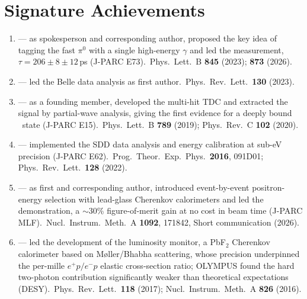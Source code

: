 \documentclass[a4paper,11pt,fontset=none]{ctexart}
\begin{document}
\section{Signature Achievements}
\begin{enumerate}
  \item {} --- as spokesperson and corresponding author, proposed the key idea of tagging the fast $\pi^0$ with a single high-energy $\gamma$ and led the measurement, $\tau=206\pm8\pm12$\,ps (J-PARC E73). \,{\small Phys.\ Lett.\ B \textbf{845} (2023); \textbf{873} (2026).}
  \item {} --- led the Belle data analysis as first author. \,{\small Phys.\ Rev.\ Lett.\ \textbf{130} (2023).}
  \item {} --- as a founding member, developed the multi-hit TDC and extracted the signal by partial-wave analysis, giving the first evidence for a deeply bound \Kmpp\ state (J-PARC E15). \,{\small Phys.\ Lett.\ B \textbf{789} (2019); Phys.\ Rev.\ C \textbf{102} (2020).}
  \item {} --- implemented the SDD data analysis and energy calibration at sub-eV precision (J-PARC E62). \,{\small Prog.\ Theor.\ Exp.\ Phys.\ \textbf{2016}, 091D01; Phys.\ Rev.\ Lett.\ \textbf{128} (2022).}
  \item {} --- as first and corresponding author, introduced event-by-event positron-energy selection with lead-glass Cherenkov calorimeters and led the demonstration, a $\sim$30\% figure-of-merit gain at no cost in beam time (J-PARC MLF). \,{\small Nucl.\ Instrum.\ Meth.\ A \textbf{1092}, 171842, Short communication (2026).}
  \item {} --- led the development of the luminosity monitor, a PbF$_2$ Cherenkov calorimeter based on M{\o}ller/Bhabha scattering, whose precision underpinned the per-mille $e^+p/e^-p$ elastic cross-section ratio; OLYMPUS found the hard two-photon contribution significantly weaker than theoretical expectations (DESY). \,{\small Phys.\ Rev.\ Lett.\ \textbf{118} (2017); Nucl.\ Instrum.\ Meth.\ A \textbf{826} (2016).}
\end{enumerate}
\end{document}
